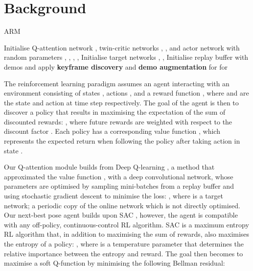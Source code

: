 \documentclass[letterpaper, 10 pt, journal, twoside]{IEEEtran}
\begin{document}
\section{Background}

\begin{algorithm*}[tb]
\caption{ARM}
\label{alg:arm}
\begin{algorithmic}
    \State Initialise Q-attention network , twin-critic networks , , and actor network  with random parameters , , , , 
    \State Initialise target networks , , 
    \State Initialise replay buffer  with demos and apply \textbf{keyframe discovery} and \textbf{demo augmentation}
	        \State 
	        \State  {}
	        \State 
	        \State  {}
	        \State   {}
	        \State  {}
	    \EndFor
    	    \State  {}
    	    \State  for  
    	    \State  {}
    	    \State  {}
    	    \State  for  
    	\EndFor
    \EndFor
\end{algorithmic}
\end{algorithm*}

The reinforcement learning paradigm assumes an agent interacting with an environment consisting of states , actions , and a reward function , where  and  are the state and action at time step  respectively. The goal of the agent is then to discover a policy  that results in maximising the expectation of the sum of discounted rewards: , where future rewards are weighted with respect to the discount factor . Each policy  has a corresponding value function , which represents the expected return when following the policy after taking action  in state .

Our Q-attention module builds from Deep Q-learning \cite{mnih2015human}, a method that approximated the value function , with a deep convolutional network, whose parameters  are optimised by sampling mini-batches from a replay buffer  and using stochastic gradient descent to minimise the loss: , where  is a target network; a periodic copy of the online network  which is not directly optimised. Our next-best pose agent builds upon SAC \cite{haarnoja2018soft}, however, the agent is compatible with any off-policy, continuous-control RL algorithm. SAC is a maximum entropy RL algorithm that, in addition to maximising the sum of rewards, also maximises the entropy of a policy: , where  is a temperature parameter that determines the relative importance between the entropy and reward. The goal then becomes to maximise a soft Q-function  by minimising the following Bellman residual:
\end{document}

